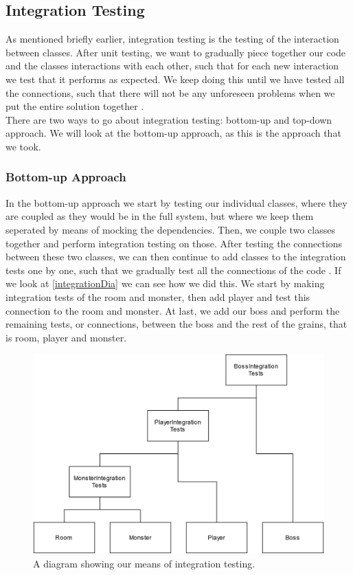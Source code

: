 \subsection{Integration Testing}
As mentioned briefly earlier, integration testing is the testing of the interaction between classes. After unit testing, we want to gradually piece together our code and the classes interactions with each other, such that for each new interaction we test that it performs as expected. We keep doing this until we have tested all the connections, such that there will not be any unforeseen problems when we put the entire solution together \cite{TestingBlackbox}. \\
There are two ways to go about integration testing: bottom-up and top-down approach. We will look at the bottom-up approach, as this is the approach that we took. 
\subsubsection{Bottom-up Approach}
In the bottom-up approach we start by testing our individual classes, where they are coupled as they would be in the full system, but where we keep them seperated by means of mocking the dependencies. Then, we couple two classes together and perform integration testing on those. After testing the connections between these two classes, we can then continue to add classes to the integration tests one by one, such that we gradually test all the connections of the code \cite{TestingBlackbox}. If we look at \autoref{integrationDia} we can see how we did this. We start by making integration tests of the room and monster, then add player and test this connection to the room and monster. At last, we add our boss and perform the remaining tests, or connections, between the boss and the rest of the grains, that is room, player and monster.
\begin{figure}
    \centering
    \includegraphics[width=0.7\linewidth]{Materials/TestingTheory/IntegrationDiagram}
    \caption{A diagram showing our means of integration testing.}
    \label{integrationDia}
\end{figure}
